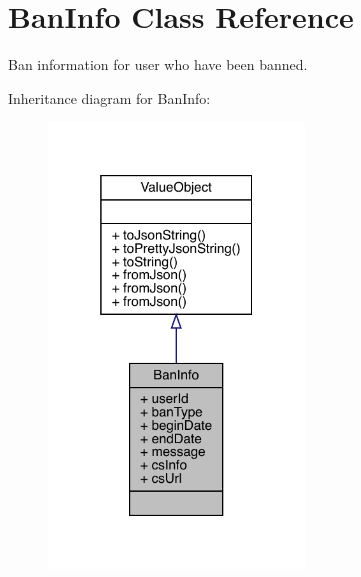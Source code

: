 \hypertarget{classcom_1_1toast_1_1android_1_1gamebase_1_1auth_1_1data_1_1_ban_info}{}\section{Ban\+Info Class Reference}
\label{classcom_1_1toast_1_1android_1_1gamebase_1_1auth_1_1data_1_1_ban_info}


Ban information for user who have been banned.  




Inheritance diagram for Ban\+Info\+:
\nopagebreak
\begin{figure}[H]
\begin{center}
\leavevmode
\includegraphics[width=193pt]{classcom_1_1toast_1_1android_1_1gamebase_1_1auth_1_1data_1_1_ban_info__inherit__graph}
\end{center}
\end{figure}


